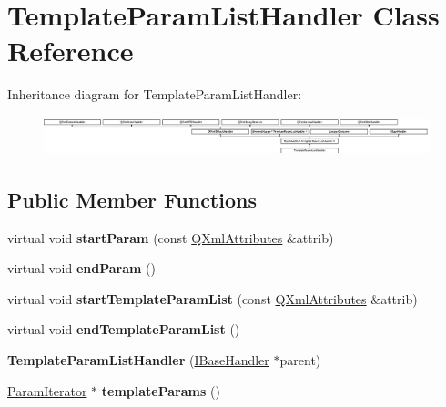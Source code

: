 \hypertarget{class_template_param_list_handler}{}\section{Template\+Param\+List\+Handler Class Reference}
\label{class_template_param_list_handler}
Inheritance diagram for Template\+Param\+List\+Handler\+:\begin{figure}[H]
\begin{center}
\leavevmode
\includegraphics[height=1.134752cm]{class_template_param_list_handler}
\end{center}
\end{figure}
\subsection*{Public Member Functions}
\begin{DoxyCompactItemize}
\item 
\mbox{\label{class_template_param_list_handler_a837b521c7130d512244b322264e4b641}} 
virtual void {\bfseries start\+Param} (const \mbox{\hyperlink{class_q_xml_attributes}{Q\+Xml\+Attributes}} \&attrib)
\item 
\mbox{\label{class_template_param_list_handler_ab8cf25022e54fb7579de90965016941b}} 
virtual void {\bfseries end\+Param} ()
\item 
\mbox{\label{class_template_param_list_handler_aa4ec312732083c8944ee9cbfcafb85f1}} 
virtual void {\bfseries start\+Template\+Param\+List} (const \mbox{\hyperlink{class_q_xml_attributes}{Q\+Xml\+Attributes}} \&attrib)
\item 
\mbox{\label{class_template_param_list_handler_ad1bc9c2624603ba93fa6db1cd39fde8c}} 
virtual void {\bfseries end\+Template\+Param\+List} ()
\item 
\mbox{\label{class_template_param_list_handler_a60c98132bd203ad79090d8d7c0971980}} 
{\bfseries Template\+Param\+List\+Handler} (\mbox{\hyperlink{class_i_base_handler}{I\+Base\+Handler}} $\ast$parent)
\item 
\mbox{\label{class_template_param_list_handler_a946f9972b2f93f643139c0726d7f2861}} 
\mbox{\hyperlink{class_param_iterator}{Param\+Iterator}} $\ast$ {\bfseries template\+Params} ()
\end{DoxyCompactItemize}
